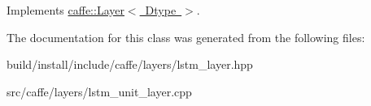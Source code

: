 Implements \mbox{\hyperlink{classcaffe_1_1_layer_a7fe981e8af8d93d587acf2a952be563d}{caffe\+::\+Layer$<$ Dtype $>$}}.



The documentation for this class was generated from the following files\+:\begin{DoxyCompactItemize}
\item 
build/install/include/caffe/layers/lstm\+\_\+layer.\+hpp\item 
src/caffe/layers/lstm\+\_\+unit\+\_\+layer.\+cpp\end{DoxyCompactItemize}
